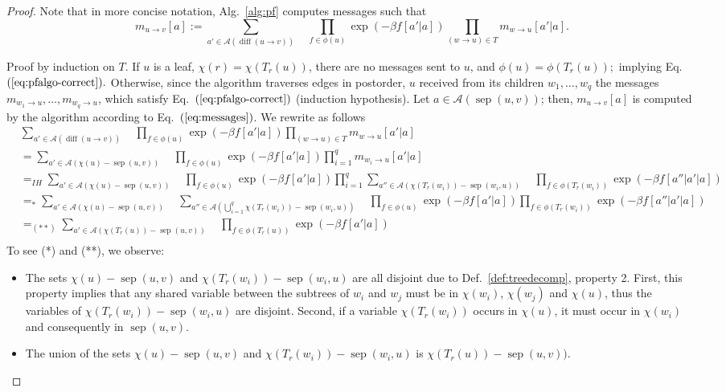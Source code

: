 \documentclass{bioinfo}
\newcommand{\val}{a} %
\newcommand{\separator}[2]{\operatorname{sep}(#1,#2)}
\newcommand{\difference}[2]{\operatorname{diff}(#1 \rightarrow #2)}
\newcommand{\Message}[2]{m_{#1\rightarrow #2}}
\newcommand{\assignments}{\mathcal{A}}
\begin{document}
\begin{proof}
  Note that in more concise notation, Alg.~\ref{alg:pf} computes
  messages such that
\begin{equation}
  \Message{u}{v}[\val] := \sum_{\val'\in\assignments(\difference{u}{v})}\quad
  \prod_{f\in \phi(u) } \exp(-\beta f[\val'|\val]) \prod_{(w\to u) \in T} m_{w\to u}[\val'|\val].\label{eq:messages}
\end{equation}

Proof by induction on $T$. If $u$ is a leaf, $\chi(r) = \chi(T_r(u))$,
there are no messages sent to $u$, and $\phi(u) = \phi(T_r(u));$ implying
Eq.~$(\ref{eq:pfalgo-correct}).$
%
Otherwise, since the algorithm traverses edges in postorder, $u$ received from its children
$w_1,\dots,w_q$ the messages $m_{w_1\to u}, \dots, m_{w_q\to u}$, which satisfy Eq.~$(\ref{eq:pfalgo-correct})$ (induction hypothesis). Let $\val\in\assignments(\separator{u}{v})$; then, $\Message{u}{v}[\val]$ is computed by the algorithm according to Eq.~$(\ref{eq:messages})$. We rewrite as follows
\begin{align*}
  & \sum_{\val'\in\assignments(\difference{u}{v})}\quad
    \prod_{f\in \phi(u) } \exp(-\beta f[\val'|\val])
    \prod_{(w\to u) \in T} m_{w\to u}[\val'|\val]\\
  & = \sum_{\val'\in\assignments(\chi(u)-\separator{u}{v})}\quad
    \prod_{f\in \phi(u) } \exp(-\beta f[\val'|\val])
    \prod_{i=1}^q m_{w_i\to u}[\val'|\val]\\
  & =_{IH}
    \sum_{\val'\in\assignments(\chi(u)-\separator{u}{v})}\quad
    \prod_{f\in \phi(u) } \exp(-\beta f[\val'|\val])
    \prod_{i=1}^q \sum_{\val''\in\assignments(\chi(T_r(w_i))-\separator{w_i}{u})} \quad
    \prod_{f\in\phi(T_r(w_i))} \exp(-\beta f[\val'' | \val' | \val]) \\
& =_{*}
    \sum_{\val'\in\assignments(\chi(u)-\separator{u}{v})}\quad
  \sum_{\val''\in\assignments(\bigcup_{i=1}^q\chi(T_r(w_i))-\separator{w_i}{u})} \quad
  \prod_{f\in \phi(u) } \exp(-\beta f[\val'|\val])
  \prod_{f\in\phi(T_r(w_i))} \exp(-\beta f[\val'' | \val' | \val]) \\
  & =_{(**)} \sum_{\val'\in\assignments(\chi(T_r(u))-\separator{u}{v})}\quad
    \prod_{f\in \phi(T_r(u)) } \exp(-\beta f[\val'|\val])\\
\end{align*}
To see (*) and (**), we observe:
\begin{itemize}
\item The sets $\chi(u)-\separator{u}{v}$ and
  $\chi(T_r(w_i))-\separator{w_i}{u}$ are all disjoint due to
  Def.~\ref{def:treedecomp}, property 2. First, this property implies
  that any shared variable between the subtrees of $w_i$ and $w_j$
  must be in $\chi(w_i)$, $\chi(w_j)$ and $\chi(u)$, thus the
  variables of $\chi(T_r(w_i))-\separator{w_i}{u}$ are
  disjoint. Second, if a variable $\chi(T_r(w_i))$ occurs in
  $\chi(u)$, it must occur in $\chi(w_i)$ and consequently in $\separator{u}{v}$.
\item The union of the sets $\chi(u)-\separator{u}{v}$ and
  $\chi(T_r(w_i))-\separator{w_i}{u}$ is $\chi(T_r(u))-\separator{u}{v}).$
\end{itemize}

\end{proof}
\end{document}
